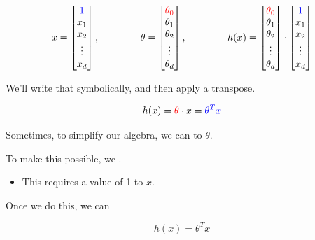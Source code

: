         \begin{equation}
            x = 
            \begin{bmatrix}
              \textcolor{blue}{1} \\ x_1 \\ x_2  \\ \vdots \\ x_d
            \end{bmatrix},
            \;\;\;\;\;\;\;\;\;\;\;\;\;\;\;
            \theta = 
            \begin{bmatrix}
              \textcolor{red}{\theta_0} \\ \theta_1 \\ \theta_2  \\ \vdots \\ \theta_d
            \end{bmatrix},
            \;\;\;\;\;\;\;\;\;\;\;\;\;\;\;
            h(x) = 
            \begin{bmatrix}
              \textcolor{red}{\theta_0} \\ \theta_1 \\ \theta_2  \\ \vdots \\ \theta_d
            \end{bmatrix}
            \cdot
            \begin{bmatrix}
              \textcolor{blue}{1} \\ x_1 \\ x_2 \\ \vdots \\ x_d
            \end{bmatrix}
        \end{equation}

        We'll write that symbolically, and then apply a transpose.
        
        \begin{equation}
            h(x) = \textcolor{red}{\theta} \cdot x = \textcolor{blue}{ \theta^T x }
        \end{equation}
        
        \begin{concept}
            Sometimes, to simplify our algebra, we can  to $\theta$. 
            
            To make this possible, we .
            
            \begin{itemize}
                \item This requires  a value of 1 to $x$.
            \end{itemize}
            
            Once we do this, we can  
            
            \begin{equation*}
                h(x)=\theta^T x
            \end{equation*}
        \end{concept}
        

